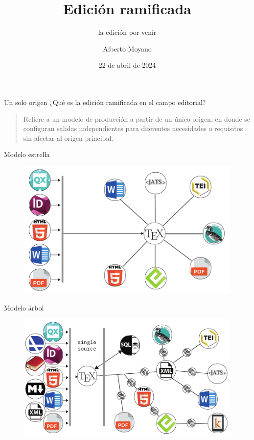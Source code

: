 \documentclass[14pt,aspectratio=169]{beamer}
\title{Edición ramificada}
\subtitle{la edición por venir}
\author{Alberto Moyano}
\date{22 de abril de 2024}
\institute{\url{https://github.com/albertomoyano/CHARLAUBA2}}
\begin{document}
	\begin{frame}
		\titlepage
	\end{frame}

\begin{frame}{Un solo origen}
	¿Qué es la edición ramificada en el campo editorial?\vspace{14pt}

	\begin{quote}
	Refiere a un modelo de producción a partir de un único origen, en donde se configuran salidas independientes para diferentes necesidades o requisitos sin afectar al origen principal.
	\end{quote}
\end{frame}

\begin{frame}{Modelo estrella}
	\begin{figure}
		\centering
		\includegraphics[width=.7\textwidth]{estrella.pdf}
	\end{figure}
\end{frame}

\begin{frame}{Modelo árbol}
	\begin{figure}
		\centering
		\includegraphics[width=.8\textwidth]{arbol.pdf}
	\end{figure}
\end{frame}
\end{document}
